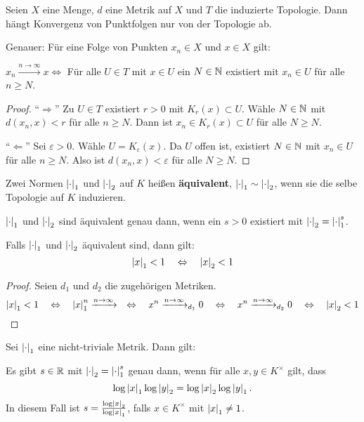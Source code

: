 \begin{Bem}
Seien $X$ eine Menge, $d$ eine Metrik auf $X$ und $T$ die induzierte Topologie. Dann hängt Konvergenz von Punktfolgen nur von der Topologie ab.

\bigskip
Genauer: Für eine Folge von Punkten $x_n \in X$ und $x \in X$ gilt:

$x_n \xrightarrow{n \to \infty} x \Leftrightarrow$  Für alle $U \in T$ mit $x \in U$ ein $N \in \mathbb{N}$ existiert mit $x_n \in U$ für alle $n \geq N$.
\end{Bem}

\begin{proof}
\enquote{$\Rightarrow$} Zu $U \in T$ existiert $ r>0$ mit $K_r(x) \subset U$. Wähle $N \in \mathbb{N}$ mit $d(x_n,x) < r$ für alle $n\geq N$. Dann ist $x_n \in K_r(x) \subset U$ für alle $N \geq N$.

\bigskip \enquote{$\Leftarrow$} Sei $\varepsilon > 0$. Wähle $U = K_\varepsilon(x)$. Da $U$ offen ist, existiert $N \in \mathbb{N}$ mit $x_n \in U$ für alle $n\geq N$. Also ist $d(x_n,x) < \varepsilon$ für alle $N\geq N$.
\end{proof}


\begin{defi}
Zwei Normen $\left|{\cdot}\right|_1$ und $\left|{\cdot}\right|_2$ auf $K$ heißen \textbf{äquivalent}, $\left|{\cdot}\right|_1 \sim \left|{\cdot}\right|_2$, wenn sie die selbe Topologie auf $K$ induzieren.
\end{defi}


\begin{Prop}
$\left|{\cdot}\right|_1$ und $\left|{\cdot}\right|_2$ sind äquivalent genau dann, wenn ein $s > 0$ existiert mit $\left|{\cdot}\right|_2 = \left|{\cdot}\right|_1^s$.
\end{Prop}

\begin{Lem}
Falls $\left|{\cdot}\right|_1$ und $\left|{\cdot}\right|_2$ äquivalent sind, dann gilt:
\[ \left|{x}\right|_1 < 1 \quad \Leftrightarrow \quad \left|{x}\right|_2 < 1
\]
\end{Lem}

\begin{proof}
Seien $d_1$ und $d_2$ die zugehörigen Metriken.
\[ \left|{x}\right|_1 < 1 
\quad \Leftrightarrow \quad  \left|{x}\right|_1^n \xrightarrow{n \to \infty}
\quad \Leftrightarrow \quad x^n \xrightarrow{n \to \infty}_{d_1} 0
\quad \Leftrightarrow \quad x^n \xrightarrow{n \to \infty}_{d_2} 0
\quad \Leftrightarrow \quad \left|{x}\right|_2 < 1 
\]
\end{proof}

\begin{Lem}
Sei $\left|{\cdot}\right|_1$ eine nicht-triviale Metrik. Dann gilt:

Es gibt $s \in \mathbb{R}$ mit $\left|{\cdot}\right|_2 = \left|{\cdot}\right|_1^s$ genau dann, wenn
für alle $x,y \in K^\times$ gilt, dass
\[\log \left|{x}\right|_1 \log \left|{y}\right|_2 = \log \left|{x}\right|_2 \log \left|{y}\right|_1.
\]
In diesem Fall ist $s = \frac{\log \left|{x}\right|_2}{\log \left|{x}\right|_1}$, falls $x \in K^\times$ mit $\left|{x}\right|_1 \neq 1$.
\end{Lem}


